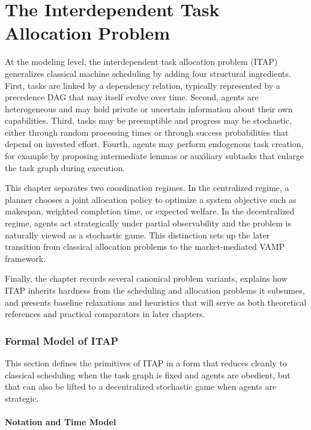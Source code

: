 \chapter{The Interdependent Task Allocation Problem}\label{chap:task_allocation}

At the modeling level, the interdependent task allocation problem (ITAP) generalizes classical machine scheduling by adding four structural ingredients. First, tasks are linked by a dependency relation, typically represented by a precedence DAG that may itself evolve over time. Second, agents are heterogeneous and may hold private or uncertain information about their own capabilities. Third, tasks may be preemptible and progress may be stochastic, either through random processing times or through success probabilities that depend on invested effort. Fourth, agents may perform endogenous task creation, for example by proposing intermediate lemmas or auxiliary subtasks that enlarge the task graph during execution.

This chapter separates two coordination regimes. In the centralized regime, a planner chooses a joint allocation policy to optimize a system objective such as makespan, weighted completion time, or expected welfare. In the decentralized regime, agents act strategically under partial observability and the problem is naturally viewed as a stochastic game. This distinction sets up the later transition from classical allocation problems to the market-mediated VAMP framework.

Finally, the chapter records several canonical problem variants, explains how ITAP inherits hardness from the scheduling and allocation problems it subsumes, and presents baseline relaxations and heuristics that will serve as both theoretical references and practical comparators in later chapters.

\subsection{Formal Model of ITAP}

This section defines the primitives of ITAP in a form that reduces cleanly to classical scheduling when the task graph is fixed and agents are obedient, but that can also be lifted to a decentralized stochastic game when agents are strategic.

\subsubsection{Notation and Time Model}

